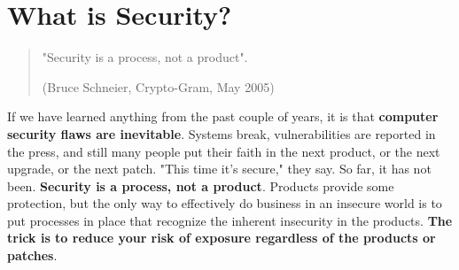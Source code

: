  {}




\section{What is Security?}
\begin{quote}
  "Security is a process, not a product".
  \begin{flushright}
    (Bruce Schneier, Crypto-Gram, May 2005)
  \end{flushright}
\end{quote}


If we have learned anything from the past couple of years, it is that \textbf{computer security flaws are inevitable}.
Systems break, vulnerabilities are reported in the press, and still many people put their faith in the next product, or the next upgrade, or the next patch. "This time it's secure," they say. So far, it has not been.
\textbf{Security is a process, not a product}. Products provide some protection, but the only way to effectively do business in an insecure world is to put processes in place that recognize the inherent insecurity in the products.
\textbf{The trick is to reduce your risk of exposure regardless of the products or patches}.


